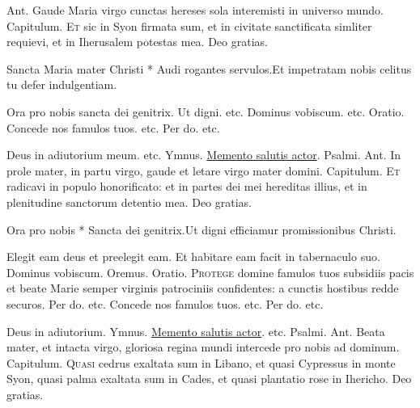 \begin{multicols*}{2}
{\color{Red} Ant.} Gaude Maria virgo cunctas hereses sola interemisti in universo mundo. {\color{Red} Capitulum.}
\lettrine[lines=2]{\zallmancaps \color{Blue} E}{t} sic in Syon firmata sum, et in civitate sanctificata simliter requievi, et in Iherusalem potestas mea. Deo gratias.
\begin{responsory-breve}
{Sancta Maria mater Christi * Audi rogantes servulos.}{Et impetratam nobis celitus tu defer indulgentiam.}
\end{responsory-breve}
\V Ora pro nobis sancta dei genitrix. \R Ut digni. etc. Dominus vobiscum. etc. {\color{Red} Oratio.}
{\zallmancaps \color{Red} C}{oncede} nos famulos tuos. etc. Per do. etc.
{\color{Red} }
\par \noindent Deus in adiutorium meum. etc. {\color{Red} Ymnus.} \hyperlink{memento-salutis}{{\zallmancaps \color{Red} M}emento salutis actor}. {\color{Red} Psalmi.}
{\color{Red} Ant.} In prole mater, in partu virgo, gaude et letare virgo mater domini. {\color{Red} Capitulum.}
\lettrine[lines=2]{\zallmancaps \color{Red} E}{t} radicavi in populo honorificato: et in partes dei mei hereditas illius, et in plenitudine sanctorum detentio mea. Deo gratias.
\begin{responsory-breve}
{Ora pro nobis * Sancta dei genitrix.}{Ut digni efficiamur promissionibus Christi.}
\end{responsory-breve}
\V Elegit eam deus et preelegit eam. \R Et habitare eam facit in tabernaculo suo. Dominus vobiscum. Oremus. {\color{Red} Oratio.}
\lettrine[lines=2]{\zallmancaps \color{Blue} P}{rotege} domine famulos tuos subsidiis pacis et beate Marie semper virginis patrociniis confidentes: a cunctis hostibus redde securos. Per do. etc.
{\zallmancaps \color{Red} C}{oncede} nos famulos tuos. etc. Per do. etc.
{\color{Red} }
\par \noindent Deus in adiutorium. {\color{Red} Ymnus.} \hyperlink{memento-salutis}{{\zallmancaps \color{Red} M}emento salutis actor}. etc. {\color{Red} Psalmi.}
{\color{Red} Ant.} Beata mater, et intacta virgo, gloriosa regina mundi intercede pro nobis ad dominum. {\color{Red} Capitulum.}
\lettrine[lines=2]{\zallmancaps \color{Red} Q}{uasi} cedrus exaltata sum in Libano, et quasi Cypressus in monte Syon, quasi palma exaltata sum in Cades, et quasi plantatio rose in Ihericho. Deo gratias.

\end{multicols*}
